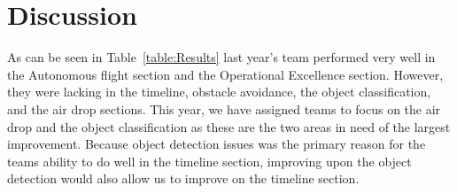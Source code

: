 \documentclass[]{auvsi_doc}
\begin{document}
\section{Discussion}
As can be seen in Table~\ref{table:Results} last year's team performed very well in the Autonomous flight section and the Operational Excellence section. However, they were lacking in the timeline, obstacle avoidance, the object classification, and the air drop sections. This year, we have assigned teams to focus on the air drop and the object classification as these are the two areas in need of the largest improvement. Because object detection issues was the primary reason for the teams ability to do well in the timeline section, improving upon the object detection would also allow us to improve on the timeline section.
\end{document}
